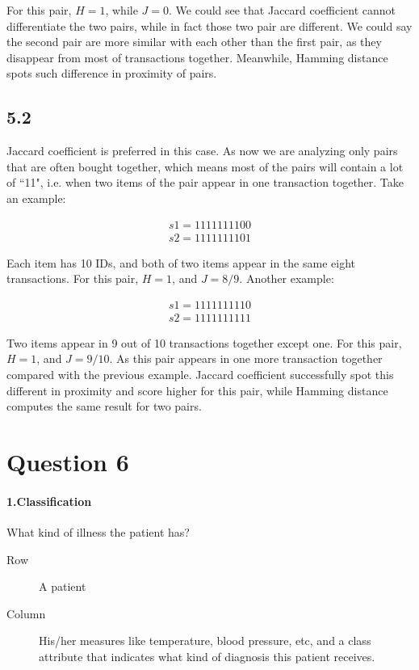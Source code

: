 \documentclass[paper=a4, fontsize=11pt]{scrartcl} %
\begin{document}
For this pair, $H=1$, while $J=0$. We could see that Jaccard coefficient cannot differentiate the two pairs, while in fact those two pair are different. We could say the second pair are more similar with each other than the first pair, as they disappear from most of transactions together. Meanwhile, Hamming distance spots such difference in proximity of pairs.

\subsection*{5.2}

Jaccard coefficient is preferred in this case. As now we are analyzing only pairs that are often bought together, which means most of the pairs will contain a lot of ``11", i.e. when two items of the pair appear in one transaction together. Take an example:

\begin{align}
s1=1111111100\\
s2=1111111101
\end{align}

Each item has 10 IDs, and both of two items appear in the same eight transactions. For this pair, $H=1$, and $J=8/9$. Another example:

\begin{align}
s1=1111111110\\
s2=1111111111
\end{align}

Two items appear in 9 out of 10 transactions together except one. For this pair, $H=1$, and $J=9/10$. As this pair appears in one more transaction together compared with the previous example. Jaccard coefficient successfully spot this different in proximity and score higher for this pair, while Hamming distance computes the same result for two pairs.

\section*{Question 6}

\paragraph{1.Classification} What kind of illness the patient has?
\begin{description}
\item[Row] A patient
\item[Column] His/her measures like temperature, blood pressure, etc, and a class attribute that indicates what kind of diagnosis this patient receives.
\end{description}
\end{document}
